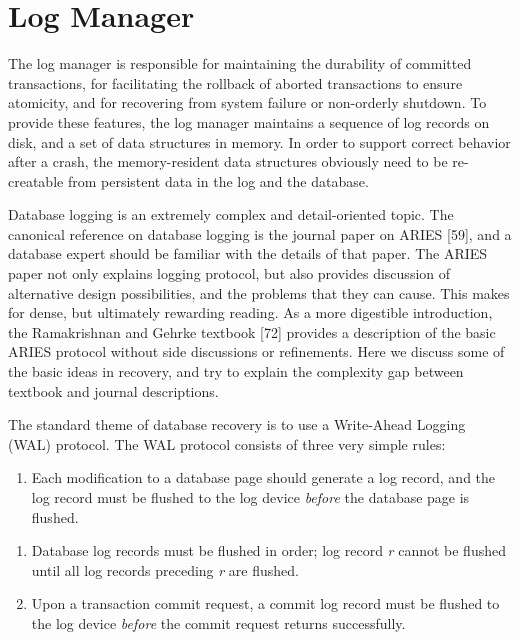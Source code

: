 \documentclass[a4paper,11pt,twoside,openright]{book}
\begin{document}
\hypertarget{log-manager}{%
\section{Log Manager}\label{log-manager}}

The log manager is responsible for maintaining the durability of
committed transactions, for facilitating the rollback of aborted
transactions to ensure atomicity, and for recovering from system failure
or non-orderly shutdown. To provide these features, the log manager
maintains a sequence of log records on disk, and a set of data
structures in memory. In order to support correct behavior after a
crash, the memory-resident data structures obviously need to be
re-creatable from persistent data in the log and the database.

Database logging is an extremely complex and detail-oriented topic. The
canonical reference on database logging is the journal paper on ARIES
{[}59{]}, and a database expert should be familiar with the details of
that paper. The ARIES paper not only explains logging protocol, but also
provides discussion of alternative design possibilities, and the
problems that they can cause. This makes for dense, but ultimately
rewarding reading. As a more digestible introduction, the Ramakrishnan
and Gehrke textbook {[}72{]} provides a description of the basic ARIES
protocol without side discussions or refinements. Here we discuss some
of the basic ideas in recovery, and try to explain the complexity gap
between textbook and journal descriptions.

The standard theme of database recovery is to use a Write-Ahead Logging
(WAL) protocol. The WAL protocol consists of three very simple rules:

\begin{enumerate}
\def\labelenumi{\arabic{enumi}.}

\item
  Each modification to a database page should generate a log record, and
  the log record must be flushed to the log device \emph{before} the
  database page is flushed.
\end{enumerate}

\begin{enumerate}
\def\labelenumi{\arabic{enumi}.}
\setcounter{enumi}{1}
\item
  Database log records must be flushed in order; log record \emph{r}
  cannot be flushed until all log records preceding \emph{r} are
  flushed.
\item
  Upon a transaction commit request, a commit log record must be flushed
  to the log device \emph{before} the commit request returns
  successfully.
\end{enumerate}
\end{document}
